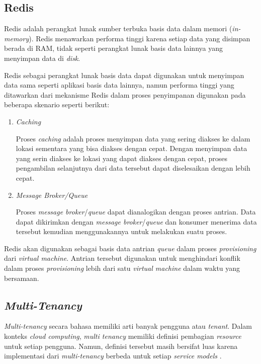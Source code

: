 \subsection{Redis}
\label{sec:redis}

Redis adalah perangkat lunak sumber terbuka basis data dalam memori (\emph{in-memory}).
Redis menawarkan performa tinggi karena setiap data yang disimpan berada di RAM, tidak seperti
perangkat lunak basis data lainnya yang menyimpan data di \emph{disk}.

Redis sebagai perangkat lunak basis data dapat digunakan untuk menyimpan data sama seperti
aplikasi basis data lainnya, namun performa tinggi yang ditawarkan 
dari mekanisme Redis dalam proses penyimpanan digunakan pada beberapa skenario
seperti berikut:

\begin{enumerate}

  \item \emph{Caching}
    
    Proses \emph{caching} adalah proses menyimpan data yang sering diakses ke dalam
    lokasi sementara yang bisa diakses dengan cepat. Dengan menyimpan data yang serin
    diakses ke lokasi yang dapat diakses dengan cepat, proses pengambilan selanjutnya
    dari data tersebut dapat diselesaikan dengan lebih cepat.

  \item \emph{Message Broker/Queue}

    Proses \emph{message broker}/\emph{queue} dapat dianalogikan dengan proses antrian.
    Data dapat dikirimkan dengan \emph{message broker}/\emph{queue} dan konsumer menerima
    data tersebut kemudian menggunakannya untuk melakukan suatu proses.

\end{enumerate}

Redis akan digunakan sebagai basis data antrian \emph{queue} dalam proses \emph{provisioning} dari
\emph{virtual machine}. Antrian tersebut digunakan untuk menghindari konflik dalam proses \emph{provisioning}
lebih dari satu \emph{virtual machine} dalam waktu yang bersamaan.

\subsection{\emph{Multi-Tenancy}}
\label{sec:multi-tenancy}

\emph{Multi-tenancy} secara bahasa memiliki arti banyak pengguna atau \emph{tenant}. Dalam konteks
\emph{cloud computing}, \emph{multi tenancy} memiliki definisi pembagian \emph{resource} 
untuk setiap pengguna. Namun, definisi tersebut masih bersifat luas karena implementasi
dari \emph{multi-tenancy} berbeda untuk setiap \emph{service models} \parencite{6830928}.

